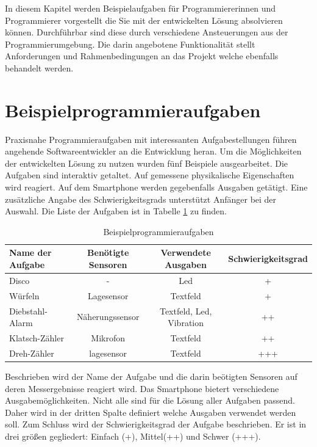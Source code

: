 \documentclass[11pt,a4paper]{report}
\begin{document}
In diesem Kapitel werden Beispielaufgaben für Programmiererinnen und Programmierer vorgestellt die Sie mit der entwickelten Lösung absolvieren können.
Durchführbar sind diese durch verschiedene Ansteuerungen aus der Programmierumgebung.
Die darin angebotene Funktionalität stellt Anforderungen und Rahmenbedingungen an das Projekt welche ebenfalls behandelt werden.

\section{Beispielprogrammieraufgaben}\label{sec:activities}
Praxisnahe Programmieraufgaben mit interessanten Aufgabestellungen führen angehende Softwareentwickler an die Entwicklung heran.
Um die Möglichkeiten der entwickelten Lösung zu nutzen wurden fünf Beispiele ausgearbeitet.
Die Aufgaben sind interaktiv getaltet.
Auf gemessene physikalische Eigenschaften wird reagiert.
Auf dem Smartphone werden gegebenfalls Ausgaben getätigt.
Eine zusätzliche Angabe des Schwierigkeitsgrads unterstützt Anfänger bei der Auswahl.
Die Liste der Aufgaben ist in Tabelle \ref{tab:excercises} zu finden.
\begin{table}[htbp]
  \centering
  \begin{tabular}{|l|c|c|c|}
      \hline
      \textbf{Name der Aufgabe} & \textbf{Benötigte Sensoren} & \textbf{Verwendete Ausgaben} & \textbf{Schwierigkeitsgrad} \\
      \hline
      Disco & - & Led & + \\
      \hline
      Würfeln & Lagesensor & Textfeld &+ \\
      \hline
      Diebstahl-Alarm & Näherungssensor & Textfeld, Led, Vibration & ++ \\
      \hline
      Klatsch-Zähler & Mikrofon & Textfeld & ++ \\
      \hline
      Dreh-Zähler & lagesensor & Textfeld & +++ \\
      \hline
  \end{tabular}
  \caption{Beispielprogrammieraufgaben}
  \label{tab:excercises}
\end{table}

Beschrieben wird der Name der Aufgabe und die darin beötigten Sensoren auf deren Messergebnisse reagiert wird.
Das Smartphone bietert verschiedene Ausgabemöglichkeiten.
Nicht alle sind für die Lösung aller Aufgaben passend.
Daher wird in der dritten Spalte definiert welche Ausgaben verwendet werden soll.
Zum Schluss wird der Schwierigkeitsgrad der Aufgabe beschrieben.
Er ist in drei größen gegliedert:
Einfach (+), Mittel(++) und Schwer (+++).
\end{document}
